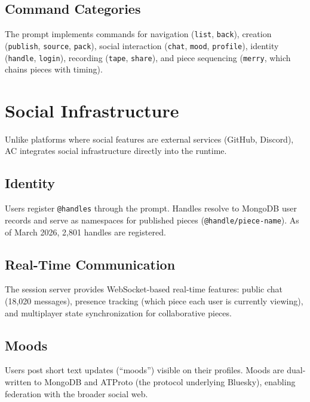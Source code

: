 \documentclass[10pt,letterpaper,twocolumn]{article}
\begin{document}
\subsection{Command Categories}

The prompt implements commands for navigation (\texttt{list}, \texttt{back}), creation (\texttt{publish}, \texttt{source}, \texttt{pack}), social interaction (\texttt{chat}, \texttt{mood}, \texttt{profile}), identity (\texttt{handle}, \texttt{login}), recording (\texttt{tape}, \texttt{share}), and piece sequencing (\texttt{merry}, which chains pieces with timing).


\section{Social Infrastructure}
\label{sec:social}

Unlike platforms where social features are external services (GitHub, Discord), AC integrates social infrastructure directly into the runtime.

\subsection{Identity}

Users register \texttt{@handles} through the prompt. Handles resolve to MongoDB user records and serve as namespaces for published pieces (\texttt{@handle/piece-name}). As of March 2026, 2,801 handles are registered.

\subsection{Real-Time Communication}

The session server provides WebSocket-based real-time features: public chat (18,020 messages), presence tracking (which piece each user is currently viewing), and multiplayer state synchronization for collaborative pieces.

\subsection{Moods}

Users post short text updates (``moods'') visible on their profiles. Moods are dual-written to MongoDB and ATProto (the protocol underlying Bluesky), enabling federation with the broader social web.
\end{document}
